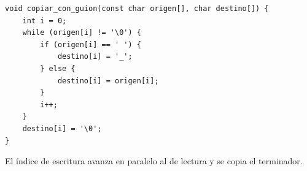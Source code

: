 \begin{enumerate}[label=\textbf{\arabic*.}]
\ifpauta\begin{solucionbox}\begin{lstlisting}[style=customc]
void copiar_con_guion(const char origen[], char destino[]) {
    int i = 0;
    while (origen[i] != '\0') {
        if (origen[i] == ' ') {
            destino[i] = '_';
        } else {
            destino[i] = origen[i];
        }
        i++;
    }
    destino[i] = '\0';
}
\end{lstlisting}El índice de escritura avanza en paralelo al de lectura y se copia el terminador.\end{solucionbox}\else\vspace{3cm}\fi
\end{enumerate}

